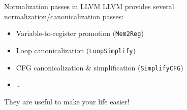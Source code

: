 \begin{frame}{Normalization passes in LLVM}
LLVM provides several \alert{normalization/canonicalization} passes:
\bigskip
\begin{itemize}
\item Variable-to-register promotion (\texttt{Mem2Reg})
\item Loop canonicalization (\texttt{LoopSimplify})
\item CFG canonicalization \& simplification (\texttt{SimplifyCFG})
\item \ldots
\end{itemize}
\bigskip
They are useful to make your life easier!
\end{frame}
